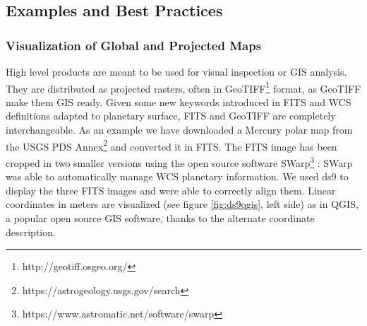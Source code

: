 \subsection{Examples and Best Practices}

\subsubsection{Visualization of Global and Projected Maps}
\label{sssec:maps}
High level products are meant to be used for visual inspection or GIS analysis.
They are distributed as projected rasters, often in
GeoTIFF\footnote{http://geotiff.osgeo.org/}
format, as GeoTIFF make them GIS ready.
Given some new keywords introduced in FITS and WCS definitions adapted to planetary
surface, FITS and GeoTIFF are completely interchangeable.
As an example we have downloaded a Mercury polar map from the USGS
PDS Annex\footnote{https://astrogeology.usgs.gov/search} and converted it in FITS.
The FITS image has been cropped in two smaller versions using the open source software
SWarp\footnote{https://www.astromatic.net/software/swarp} \citep{swarp}: SWarp was able to
automatically manage WCS planetary information.
We used ds9 to display the three FITS images and were able to correctly align them.
Linear coordinates in meters are visualized (see figure \ref{fig:ds9qgis}, left side)
as in QGIS, a popular open source GIS software, thanks to the alternate coordinate
description.
